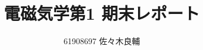 \documentclass[uplatex,a4j,11pt]{jsarticle}
\begin{document}
\title{電磁気学第1 期末レポート}
\author{61908697 佐々木良輔}
\date{}
\maketitle



\end{document}
